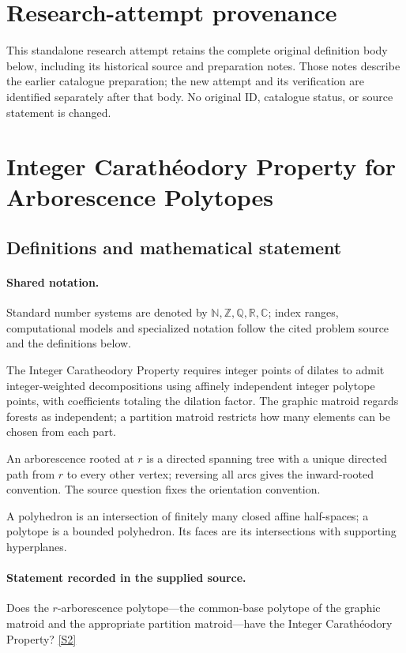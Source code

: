 \documentclass[11pt]{article}
\begin{document}
\section*{Research-attempt provenance}
This standalone research attempt retains the complete original definition body below,
including its historical source and preparation notes. Those notes describe the
earlier catalogue preparation; the new attempt and its verification are identified
separately after that body. No original ID, catalogue status, or source statement is changed.

\section{Integer Carathéodory Property for Arborescence Polytopes}\label{statement}

\subsection{Definitions and mathematical statement}

\paragraph{Shared notation.}Standard number systems are denoted by $\mathbb N,\mathbb Z,\mathbb Q,\mathbb R,\mathbb C$; index ranges, computational models and specialized notation follow the cited problem source and the definitions below.


The Integer Caratheodory Property requires integer points of dilates to admit integer-weighted decompositions using affinely independent integer polytope points, with coefficients totaling the dilation factor. The graphic matroid regards forests as independent; a partition matroid restricts how many elements can be chosen from each part.

An arborescence rooted at $r$ is a directed spanning tree with a unique directed path from $r$ to every other vertex; reversing all arcs gives the inward-rooted convention. The source question fixes the orientation convention.

A polyhedron is an intersection of finitely many closed affine half-spaces; a polytope is a bounded polyhedron. Its faces are its intersections with supporting hyperplanes.
\paragraph{Statement recorded in the supplied source.}
Does the $r$-arborescence polytope—the common-base polytope of the graphic matroid and the appropriate partition matroid—have the Integer Carathéodory Property? \href{https://doi.org/10.4171/owr/2011/53}{[S2]}
\end{document}
